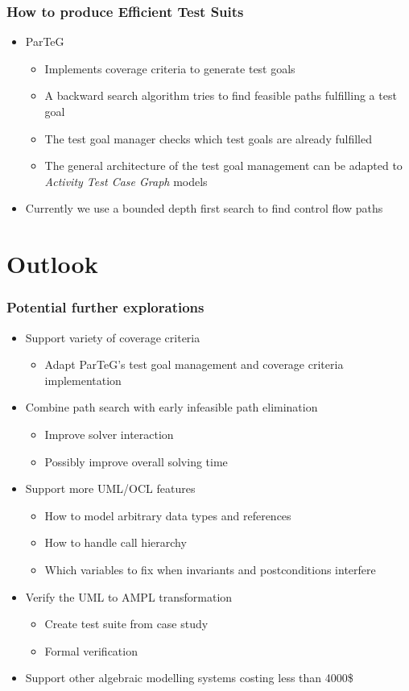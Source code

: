\documentclass{beamer}
\begin{document}
\begin{frame}
\frametitle{How to produce Efficient Test Suits}
\begin{itemize}
\item ParTeG\cite{ParTeG}
\begin{itemize}
\item Implements coverage criteria to generate test goals
\item A backward search algorithm tries to find feasible paths fulfilling a test goal
\item The test goal manager checks which test goals are already fulfilled
\item The general architecture of the test goal management can be adapted to \emph{Activity Test Case Graph} models
\end{itemize}
\item Currently we use a bounded depth first search to find control flow paths
\end{itemize}
\end{frame}


\section{Outlook} 

\begin{frame}
\frametitle{Potential further explorations}
\begin{itemize}
\item Support variety of coverage criteria
\begin{itemize}
\item Adapt ParTeG's test goal management and coverage criteria implementation
\end{itemize}
\item Combine path search with early infeasible path elimination
\begin{itemize}
\item Improve solver interaction
\item Possibly improve overall solving time
\end{itemize}
\item Support more UML/OCL features
\begin{itemize}
\item How to model arbitrary data types and references
\item How to handle call hierarchy
\item Which variables to fix when invariants and postconditions interfere
\end{itemize}
\item Verify the UML to AMPL transformation
\begin{itemize}
\item Create test suite from case study 
\item Formal verification
\end{itemize}
\item Support other algebraic modelling systems costing less than 4000\$ 
\end{itemize}
\end{frame}
\end{document}
